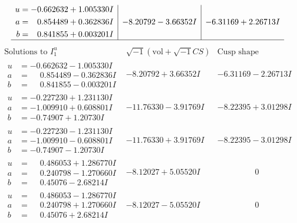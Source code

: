 \documentclass[1p]{elsarticle_modified}
\theoremstyle{definition}
\newcommand{\I}{\sqrt{-1}}
\begin{document}
$$\begin{array}{c|c|c}
\begin{aligned}
u &= -0.662632 + 1.005330 I \\
a &= \phantom{-}0.854489 + 0.362836 I \\
b &= \phantom{-}0.841855 + 0.003201 I\end{aligned}
 & -8.20792 - 3.66352 I & -6.31169 + 2.26713 I\\
 \hline 
 \end{array}$$\newpage$$\begin{array}{c|c|c}  
\text{Solutions to }I^u_{1}& \I (\text{vol} + \sqrt{-1}CS) & \text{Cusp shape}\\
 \hline 
\begin{aligned}
u &= -0.662632 - 1.005330 I \\
a &= \phantom{-}0.854489 - 0.362836 I \\
b &= \phantom{-}0.841855 - 0.003201 I\end{aligned}
 & -8.20792 + 3.66352 I & -6.31169 - 2.26713 I \\ \hline\begin{aligned}
u &= -0.227230 + 1.231130 I \\
a &= -1.009910 + 0.608801 I \\
b &= -0.74907 + 1.20730 I\end{aligned}
 & -11.76330 - 3.91769 I & -8.22395 + 3.01298 I \\ \hline\begin{aligned}
u &= -0.227230 - 1.231130 I \\
a &= -1.009910 - 0.608801 I \\
b &= -0.74907 - 1.20730 I\end{aligned}
 & -11.76330 + 3.91769 I & -8.22395 - 3.01298 I \\ \hline\begin{aligned}
u &= \phantom{-}0.486053 + 1.286770 I \\
a &= \phantom{-}0.240798 - 1.270660 I \\
b &= \phantom{-}0.45076 - 2.68214 I\end{aligned}
 & -8.12027 + 5.05520 I & \phantom{-0.000000 } 0 \\ \hline\begin{aligned}
u &= \phantom{-}0.486053 - 1.286770 I \\
a &= \phantom{-}0.240798 + 1.270660 I \\
b &= \phantom{-}0.45076 + 2.68214 I\end{aligned}
 & -8.12027 - 5.05520 I & \phantom{-0.000000 } 0 \\ \hline\begin{aligned}

\end{aligned}
\end{array}$$
\end{document}
